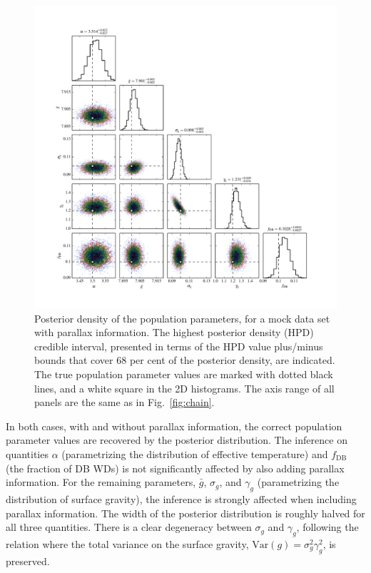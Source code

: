 \documentclass[fleqn,usenatbib]{mnras}
\newcommand{\logg}{g}
\begin{document}
\begin{figure}
	\includegraphics[width=1.\textwidth]{toy_chain_include-parallax.pdf}
    \caption{ Posterior density of the population parameters, for a mock data set with parallax information. The highest posterior density (HPD) credible interval, presented in terms of the HPD value plus/minus bounds that cover 68 per cent of the posterior density, are indicated. The true population parameter values are marked with dotted black lines, and a white square in the 2D histograms. The axis range of all panels are the same as in Fig.~\ref{fig:chain}.}
    \label{fig:chain_parallax}
\end{figure}

In both cases, with and without parallax information, the correct population parameter values are recovered by the posterior distribution. The inference on quantities $\alpha$ (parametrizing the distribution of effective temperature) and $f_\text{DB}$ (the fraction of DB WDs) is not significantly affected by also adding parallax information. For the remaining parameters, $\bar{g}$, $\sigma_g$, and $\gamma_g$ (parametrizing the distribution of surface gravity), the inference is strongly affected when including parallax information. The width of the posterior distribution is roughly halved for all three quantities. There is a clear degeneracy between $\sigma_g$ and $\gamma_g$, following the relation where the total variance on the surface gravity, $\text{Var}(\logg) = \sigma_g^2\gamma_g^2$, is preserved.
\end{document}
